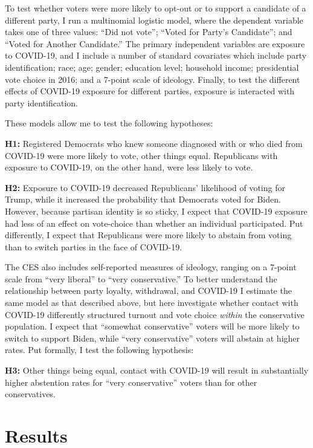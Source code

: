 \documentclass[
  12pt,
]{article}
\begin{document}
To test whether voters were more likely to opt-out or to support a candidate of a different party, I run a multinomial logistic model, where the dependent variable takes one of three values: ``Did not vote''; ``Voted for Party's Candidate''; and ``Voted for Another Candidate.'' The primary independent variables are exposure to COVID-19, and I include a number of standard covariates which include party identification; race; age; gender; education level; household income; presidential vote choice in 2016; and a 7-point scale of ideology. Finally, to test the different effects of COVID-19 exposure for different parties, exposure is interacted with party identification.

These models allow me to test the following hypotheses:

\textbf{H1:} Registered Democrats who knew someone diagnosed with or who died from COVID-19 were more likely to vote, other things equal. Republicans with exposure to COVID-19, on the other hand, were less likely to vote.

\textbf{H2:} Exposure to COVID-19 decreased Republicans' likelihood of voting for Trump, while it increased the probability that Democrats voted for Biden. However, because partisan identity is so sticky, I expect that COVID-19 exposure had less of an effect on vote-choice than whether an individual participated. Put differently, I expect that Republicans were more likely to abstain from voting than to switch parties in the face of COVID-19.

The CES also includes self-reported measures of ideology, ranging on a 7-point scale from ``very liberal'' to ``very conservative.'' To better understand the relationship between party loyalty, withdrawal, and COVID-19 I estimate the same model as that described above, but here investigate whether contact with COVID-19 differently structured turnout and vote choice \emph{within} the conservative population. I expect that ``somewhat conservative'' voters will be more likely to switch to support Biden, while ``very conservative'' voters will abstain at higher rates. Put formally, I test the following hypothesis:

\textbf{H3:} Other things being equal, contact with COVID-19 will result in substantially higher abstention rates for ``very conservative'' voters than for other conservatives.

\hypertarget{results}{%
\section*{Results}\label{results}}
\end{document}
